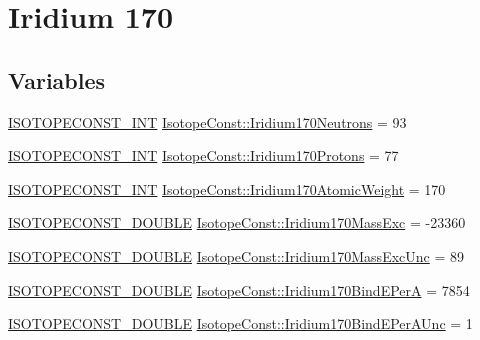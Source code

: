 \hypertarget{group___isotope_const-_iridium-_ir170}{}\section{Iridium 170}
\label{group___isotope_const-_iridium-_ir170}
\subsection*{Variables}
\begin{DoxyCompactItemize}
\item 
\mbox{\hyperlink{group___isotope_const-_macros_ga5f18360b3e99483a35c32d789e62621c}{I\+S\+O\+T\+O\+P\+E\+C\+O\+N\+S\+T\+\_\+\+I\+NT}} \mbox{\hyperlink{group___isotope_const-_iridium-_ir170_gaacc0ac3d38f77c7990715473e9c07890}{Isotope\+Const\+::\+Iridium170\+Neutrons}} = 93
\item 
\mbox{\hyperlink{group___isotope_const-_macros_ga5f18360b3e99483a35c32d789e62621c}{I\+S\+O\+T\+O\+P\+E\+C\+O\+N\+S\+T\+\_\+\+I\+NT}} \mbox{\hyperlink{group___isotope_const-_iridium-_ir170_ga974402d0aff669883e8d34f3b44073e8}{Isotope\+Const\+::\+Iridium170\+Protons}} = 77
\item 
\mbox{\hyperlink{group___isotope_const-_macros_ga5f18360b3e99483a35c32d789e62621c}{I\+S\+O\+T\+O\+P\+E\+C\+O\+N\+S\+T\+\_\+\+I\+NT}} \mbox{\hyperlink{group___isotope_const-_iridium-_ir170_ga3ab3841babbbe5c47fe95e4aa49158e9}{Isotope\+Const\+::\+Iridium170\+Atomic\+Weight}} = 170
\item 
\mbox{\hyperlink{group___isotope_const-_macros_ga8f45a7272ce02c0b4c65c44636ed719a}{I\+S\+O\+T\+O\+P\+E\+C\+O\+N\+S\+T\+\_\+\+D\+O\+U\+B\+LE}} \mbox{\hyperlink{group___isotope_const-_iridium-_ir170_ga145c9e0ebbd25309438d77a4a4286878}{Isotope\+Const\+::\+Iridium170\+Mass\+Exc}} = -\/23360
\item 
\mbox{\hyperlink{group___isotope_const-_macros_ga8f45a7272ce02c0b4c65c44636ed719a}{I\+S\+O\+T\+O\+P\+E\+C\+O\+N\+S\+T\+\_\+\+D\+O\+U\+B\+LE}} \mbox{\hyperlink{group___isotope_const-_iridium-_ir170_ga55db48c032542c7a7244fbaae50df8fa}{Isotope\+Const\+::\+Iridium170\+Mass\+Exc\+Unc}} = 89
\item 
\mbox{\hyperlink{group___isotope_const-_macros_ga8f45a7272ce02c0b4c65c44636ed719a}{I\+S\+O\+T\+O\+P\+E\+C\+O\+N\+S\+T\+\_\+\+D\+O\+U\+B\+LE}} \mbox{\hyperlink{group___isotope_const-_iridium-_ir170_ga500d9f430cf2a46167fd0ba1a62add26}{Isotope\+Const\+::\+Iridium170\+Bind\+E\+PerA}} = 7854
\item 
\mbox{\hyperlink{group___isotope_const-_macros_ga8f45a7272ce02c0b4c65c44636ed719a}{I\+S\+O\+T\+O\+P\+E\+C\+O\+N\+S\+T\+\_\+\+D\+O\+U\+B\+LE}} \mbox{\hyperlink{group___isotope_const-_iridium-_ir170_gaaf3266c680835b908613a79fdada6b5c}{Isotope\+Const\+::\+Iridium170\+Bind\+E\+Per\+A\+Unc}} = 1

\end{DoxyCompactItemize}
